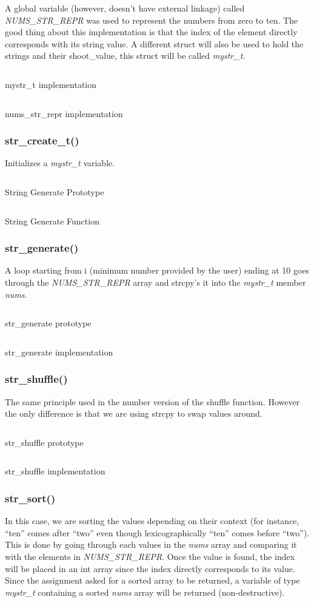 \documentclass[a4paper, 12pt, titlepage]{article}
\newenvironment{code}{\captionsetup{type=listing}}{}
\newcommand{\sourcecode}[3]{
    \begin{code}
      \inputminted[linenos,numbersep=5pt,gobble=0,frame=lines,framesep=2mm,]{c}{#1}
        \caption{#2}
        \label{lst: #3}
    \end{code}
  }
\begin{document}
\begin{onehalfspacing}
  A global variable (however, doesn't have external linkage) called \emph{NUMS\_STR\_REPR} was used to represent the numbers from zero to ten. The good thing about this implementation is that the index of the element directly corresponds with its string value. A different struct will also be used to hold the strings and their shoot\_value, this struct will be called \emph{mystr\_t}.


  \sourcecode{snippets/mystr_t.c}{mystr\_t implementation}{mystr_t}


  \sourcecode{snippets/nums_str_repr.c}{nums\_str\_repr implementation}{nums_str_repr}


  \subsubsection{str\_create\_t()}
  Initializes a \emph{mystr\_t} variable.
  \sourcecode{snippets/str_create_t_header.c}{String Generate Prototype}{str_generate_prototype}
  \sourcecode{snippets/str_create.c}{String Generate Function}{str_generate}

  \subsubsection{str\_generate()}
  A loop starting from i (minimum number provided by the user) ending at 10 goes through the \emph{NUMS\_STR\_REPR} array and strcpy's it into the \emph{mystr\_t} member \emph{nums}.
  \sourcecode{snippets/str_generate_header.c}{str\_generate prototype}{str_generate_header}
  \sourcecode{snippets/str_generate.c}{str\_generate implementation}{str_generate}

  \clearpage

  \subsubsection{str\_shuffle()}
  The same principle used in the number version of the shuffle function. However the only difference is that we are using strcpy to swap values around.

  \sourcecode{snippets/str_shuffle_header.c}{str\_shuffle prototype}{str_shuffle_prototype}
  \sourcecode{snippets/str_shuffle.c}{str\_shuffle implementation}{str_shuffle_implementation}

  \subsubsection{str\_sort()}
  In this case, we are sorting the values depending on their context (for instance, ``ten'' comes after ``two'' even though lexicographically ``ten'' comes before ``two''). This is done by going through each values in the \emph{nums} array and comparing it with the elements in \emph{NUMS\_STR\_REPR}. Once the value is found, the index will be placed in an int array since the index directly corresponds to its value. Since the assignment asked for a sorted array to be returned, a variable of type \emph{mystr\_t} containing a sorted \emph{nums} array will be returned (non-destructive).


\end{onehalfspacing}
\end{document}

